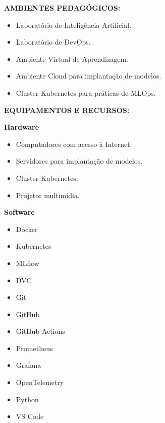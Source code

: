 \textbf{AMBIENTES PEDAGÓGICOS:}

\begin{itemize}
\item Laboratório de Inteligência Artificial.
\item Laboratório de DevOps.
\item Ambiente Virtual de Aprendizagem.
\item Ambiente Cloud para implantação de modelos.
\item Cluster Kubernetes para práticas de MLOps.
\end{itemize}

\textbf{EQUIPAMENTOS E RECURSOS:}

\textbf{Hardware}

\begin{itemize}
\item Computadores com acesso à Internet.
\item Servidores para implantação de modelos.
\item Cluster Kubernetes.
\item Projetor multimídia.
\end{itemize}

\textbf{Software}

\begin{itemize}
\item Docker
\item Kubernetes
\item MLflow
\item DVC
\item Git
\item GitHub
\item GitHub Actions
\item Prometheus
\item Grafana
\item OpenTelemetry
\item Python
\item VS Code
\end{itemize}
